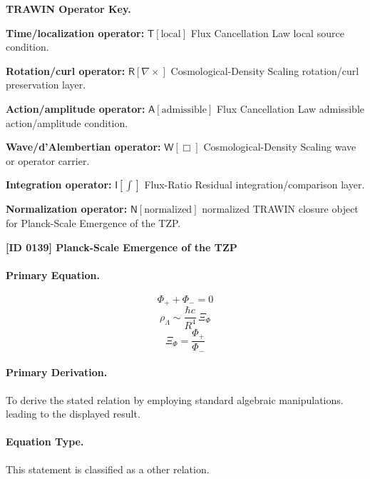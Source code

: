 \par\vspace{0.45\baselineskip}
\noindent\begin{minipage}[t]{\linewidth}
\begingroup
\small
\raggedright
\textbf{TRAWIN Operator Key.}\par
\noindent\textbf{Time/localization operator:} $\mathsf{T}\!\left[\mathrm{local}\right]$ Flux Cancellation Law local source condition.\par
\noindent\textbf{Rotation/curl operator:} $\mathsf{R}\!\left[\nabla\times\right]$ Cosmological-Density Scaling rotation/curl preservation layer.\par
\noindent\textbf{Action/amplitude operator:} $\mathsf{A}\!\left[\mathrm{admissible}\right]$ Flux Cancellation Law admissible action/amplitude condition.\par
\noindent\textbf{Wave/d'Alembertian operator:} $\mathsf{W}\!\left[\Box\right]$ Cosmological-Density Scaling wave or operator carrier.\par
\noindent\textbf{Integration operator:} $\mathsf{I}\!\left[\int\right]$ Flux-Ratio Residual integration/comparison layer.\par
\noindent\textbf{Normalization operator:} $\mathsf{N}\!\left[\mathrm{normalized}\right]$ normalized TRAWIN closure object for Planck-Scale Emergence of the TZP.\par
\endgroup
\end{minipage}

\clearpage
\noindent\textbf{[ID 0139] Planck-Scale Emergence of the TZP}\par
\vspace{0.35em}
\paragraph{Primary Equation.}
\[
\Phi_{+}+\Phi_{-}=0
\]
\[
\rho_{\Lambda}\sim \frac{\hbar c}{R^4}\,\Xi_{\Phi}
\]
\[
\Xi_{\Phi}=\frac{\Phi_{+}}{\Phi_{-}}
\]

\paragraph{Primary Derivation.}
To derive the stated relation by employing standard algebraic manipulations. leading to the displayed result.
\paragraph{Equation Type.}
This statement is classified as a other relation.

